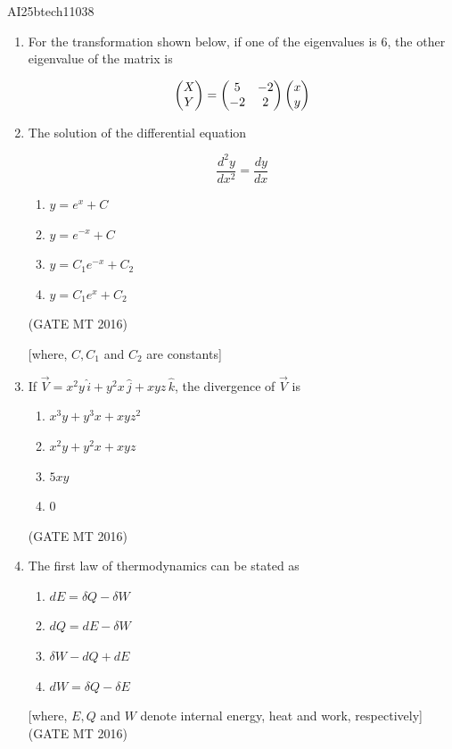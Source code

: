 \documentclass[journal, 11pt, onecolumn]{IEEEtran}
\theoremstyle{remark}
\begin{document}
\begin{center}
    \Large{AI25btech11038}
\end{center} 

\begin{enumerate}

\item For the transformation shown below, if one of the eigenvalues is 6, the other eigenvalue of the matrix is

$$\begin{pmatrix}X \\ Y\end{pmatrix} =
\begin{pmatrix}5 & -2 \\ -2 & 2\end{pmatrix}
\begin{pmatrix}x \\ y\end{pmatrix}$$


\item The solution of the differential equation

$$\frac{d^2 y}{dx^2} = \frac{dy}{dx}$$

\begin{multicols}{2}
\begin{enumerate}
\item $y = e^x + C$
\item $y = e^{-x} + C$
\item $y = C_1 e^{-x} + C_2$
\item $y = C_1 e^x + C_2$
\end{enumerate}   
\end{multicols}
\hfill(GATE MT 2016)

[where, $C, C_1$ and $C_2$ are constants]

\item If $\vec{V} = x^2 y \, \hat{i} + y^2 x \, \hat{j} + xyz \, \hat{k}$, the divergence of $\vec{V}$ is
\begin{enumerate}
\item $x^3 y + y^3 x + xyz^2$
\item $x^2 y + y^2 x + xyz$
\item $5xy$
\item $0$
\end{enumerate}
\hfill(GATE MT 2016)

\item The first law of thermodynamics can be stated as
\begin{enumerate}
\item $dE = \delta Q - \delta W$
\item $dQ = dE - \delta W$
\item $\delta W - dQ + dE$
\item $dW = \delta Q - \delta E$
\end{enumerate}
[where, $E, Q$ and $W$ denote internal energy, heat and work, respectively]
\hfill(GATE MT 2016)


\end{enumerate}
\end{document}
